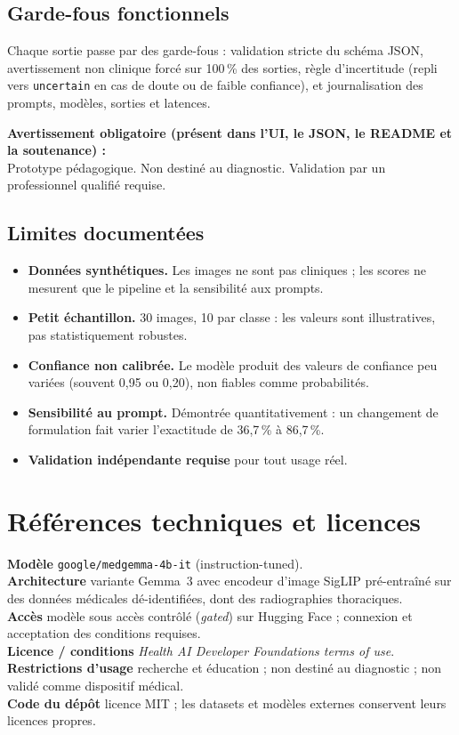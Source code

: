 \documentclass[11pt,a4paper]{article}
\begin{document}
\subsection{Garde-fous fonctionnels}
Chaque sortie passe par des garde-fous : validation stricte du schéma JSON, avertissement
non clinique forcé sur 100\,\% des sorties, règle d'incertitude (repli vers \texttt{uncertain} en
cas de doute ou de faible confiance), et journalisation des prompts, modèles, sorties et latences.

\begin{warnbox}
\textbf{Avertissement obligatoire (présent dans l'UI, le JSON, le README et la soutenance) :}\\
Prototype pédagogique. Non destiné au diagnostic. Validation par un professionnel qualifié requise.
\end{warnbox}

\subsection{Limites documentées}
\begin{itemize}[leftmargin=1.4em]
\item \textbf{Données synthétiques.} Les images ne sont pas cliniques ; les scores ne mesurent que
le pipeline et la sensibilité aux prompts.
\item \textbf{Petit échantillon.} 30 images, 10 par classe : les valeurs sont illustratives, pas
statistiquement robustes.
\item \textbf{Confiance non calibrée.} Le modèle produit des valeurs de confiance peu variées
(souvent 0,95 ou 0,20), non fiables comme probabilités.
\item \textbf{Sensibilité au prompt.} Démontrée quantitativement : un changement de formulation
fait varier l'exactitude de 36,7\,\% à 86,7\,\%.
\item \textbf{Validation indépendante requise} pour tout usage réel.
\end{itemize}

\section{Références techniques et licences}

\begin{keybox}
\textbf{Modèle} \texttt{google/medgemma-4b-it} (instruction-tuned).\\
\textbf{Architecture} variante Gemma~3 avec encodeur d'image SigLIP pré-entraîné sur des données
médicales dé-identifiées, dont des radiographies thoraciques.\\
\textbf{Accès} modèle sous accès contrôlé (\emph{gated}) sur Hugging Face ; connexion et
acceptation des conditions requises.\\
\textbf{Licence / conditions} \emph{Health AI Developer Foundations terms of use}.\\
\textbf{Restrictions d'usage} recherche et éducation ; non destiné au diagnostic ; non validé comme
dispositif médical.\\
\textbf{Code du dépôt} licence MIT ; les datasets et modèles externes conservent leurs licences
propres.
\end{keybox}
\end{document}
